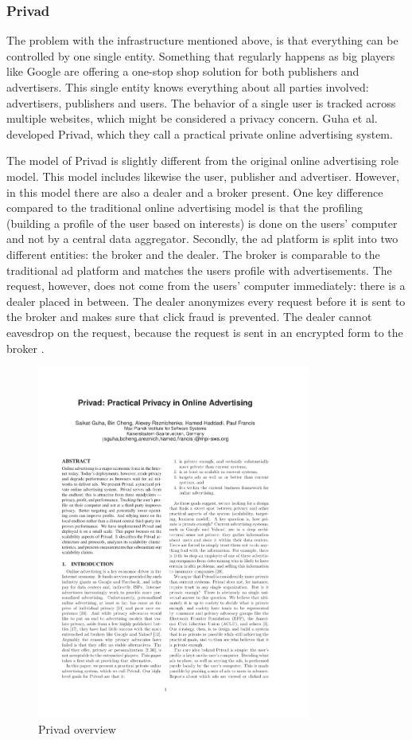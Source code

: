 \subsubsection{Privad}
\label{sec:privad}
The problem with the infrastructure mentioned above, is that everything can be controlled by one single entity. Something that regularly happens as big players like Google are offering a one-stop shop solution for both publishers and advertisers. This single entity knows everything about all parties involved: advertisers, publishers and users. The behavior of a single user is tracked across multiple websites, which might be considered a privacy concern. Guha et al. \cite{guha2011privad} developed Privad, which they call a practical private online advertising system.

The model of Privad is slightly different from the original online advertising role model. This model includes likewise the user, publisher and advertiser. However, in this model there are also a dealer and a broker present. One key difference compared to the traditional online advertising model is that the profiling (building a profile of the user based on interests) is done on the users' computer and not by a central data aggregator. Secondly, the ad platform is split into two different entities: the broker and the dealer. The broker is comparable to the traditional ad platform and matches the users profile with advertisements. The request, however, does not come from the users' computer immediately: there is a dealer placed in between. The dealer anonymizes every request before it is sent to the broker and makes sure that click fraud is prevented. The dealer cannot eavesdrop on the request, because the request is sent in an encrypted form to the broker \cite{guha2011privad, bilenko2011targeted}.

\begin{figure}[htbp]
  \centering
      \includegraphics[clip, page=3, trim=0.5cm 18.5cm 11.9cm 1cm, width=9cm]{assets/privad-performance.pdf}
  \caption{Privad overview \cite{guha2011privad}}
  \label{fig:somthing}
\end{figure}


